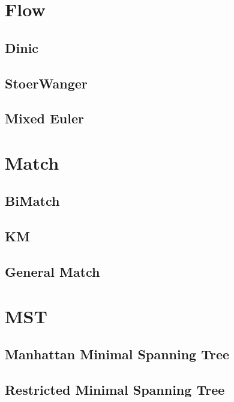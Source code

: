 \documentclass[10pt,twocolumn,oneside]{article}
\begin{document}
    \section{Flow}
    \subsection{Dinic}
    
    \subsection{StoerWanger}
    
    \subsection{Mixed Euler}
    
    \newpage

    \section{Match}
    \subsection{BiMatch}
    
    \subsection{KM}
    
    \subsection{General Match}
    
    \newpage

    \section{MST}
    \subsection{Manhattan Minimal Spanning Tree}
    
    \subsection{Restricted Minimal Spanning Tree}
    
\end{document}
